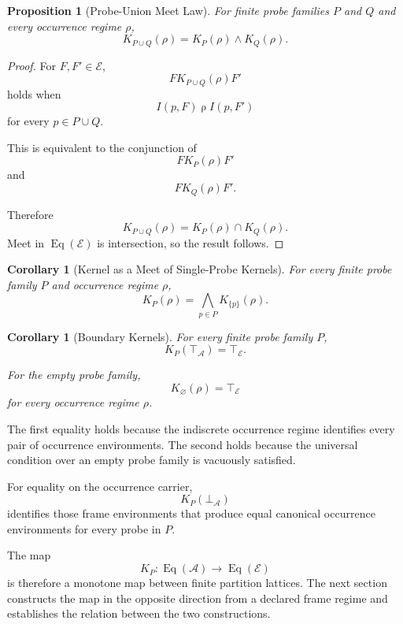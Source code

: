 \documentclass[11pt]{article}
\theoremstyle{plain}
\newtheorem{proposition}[theorem]{Proposition}
\newtheorem{corollary}[theorem]{Corollary}
\theoremstyle{definition}
\theoremstyle{remark}
\begin{document}
\begin{proposition}[Probe-Union Meet Law]
  \label{ik.prop.probe-union}
  For finite probe families \(P\) and \(Q\)
  and every occurrence regime \(\rho\),
  \[
    K_{P\cup Q}(\rho)
    =
    K_P(\rho)
    \wedge
    K_Q(\rho).
  \]
\end{proposition}

\begin{proof}
  For \(F,F'\in\mathcal{E}\),
  \[
    F\mathrel{K_{P\cup Q}(\rho)}F'
  \]
  holds when
  \[
    I(p,F)\mathrel{\rho}I(p,F')
  \]
  for every \(p\in P\cup Q\).

  This is equivalent to the conjunction of
  \[
    F\mathrel{K_P(\rho)}F'
  \]
  and
  \[
    F\mathrel{K_Q(\rho)}F'.
  \]

  Therefore
  \[
    K_{P\cup Q}(\rho)
    =
    K_P(\rho)\cap K_Q(\rho).
  \]
  Meet in \(\operatorname{Eq}(\mathcal{E})\)
  is intersection,
  so the result follows.
\end{proof}

\begin{corollary}[Kernel as a Meet of Single-Probe Kernels]
  \label{ik.cor.single-probe-meet}
  For every finite probe family \(P\)
  and occurrence regime \(\rho\),
  \[
    K_P(\rho)
    =
    \bigwedge_{p\in P}
    K_{\{p\}}(\rho).
  \]
\end{corollary}

\begin{corollary}[Boundary Kernels]
  \label{ik.cor.boundary-kernels}
  For every finite probe family \(P\),
  \[
    K_P(\top_{\mathcal{A}})
    =
    \top_{\mathcal{E}}.
  \]

  For the empty probe family,
  \[
    K_{\varnothing}(\rho)
    =
    \top_{\mathcal{E}}
  \]
  for every occurrence regime \(\rho\).
\end{corollary}

The first equality holds because
the indiscrete occurrence regime
identifies every pair of occurrence environments.
The second holds because
the universal condition over an empty probe family
is vacuously satisfied.

For equality on the occurrence carrier,
\[
  K_P(\bot_{\mathcal{A}})
\]
identifies those frame environments
that produce equal canonical occurrence environments
for every probe in \(P\).

The map
\[
  K_P:
  \operatorname{Eq}(\mathcal{A})
  \longrightarrow
  \operatorname{Eq}(\mathcal{E})
\]
is therefore a monotone map between finite partition lattices.
The next section constructs the map in the opposite direction
from a declared frame regime
and establishes the relation between the two constructions.
\end{document}
